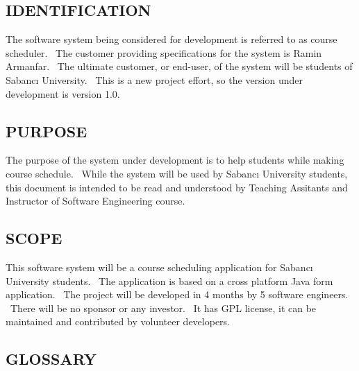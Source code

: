 \documentclass[twoside,letterpaper]{article}
\begin{document}
\subsection[IDENTIFICATION]{\rmfamily\bfseries\color{black}
IDENTIFICATION}

{\color{black}
\begin{flushleft}The software system being considered for development is referred to as course scheduler. \ The customer providing specifications
for the system is Ramin Armanfar. \ The ultimate
customer, or end-user, of the system will be students of Sabanc{\i}  University. \ This is a new project effort, so the
version under development is version 1.0.\end{flushleft}}

\subsection[PURPOSE]{\rmfamily\bfseries\color{black}
PURPOSE}

{\color{black}
\begin{flushleft}The purpose of the system under development is to help students while making course schedule. \ While the system will be used by Sabanc{\i} University students,
this document is intended to be read and understood by Teaching Assitants and Instructor of Software Engineering course.\end{flushleft}}

\subsection[SCOPE]{\rmfamily\bfseries\color{black}
SCOPE}

{\color{black}
\begin{flushleft}
This software system will be a course scheduling application for Sabanc\i{} University students. \ The application is based on a cross platform Java form application. \ The project will be developed in 4 months by 5 software engineers. \ There will be no sponsor or any investor. \ It has GPL license, it can be maintained and contributed by volunteer developers.



\end{flushleft}}

\subsection[GLOSSARY]{\rmfamily\bfseries\color{black}
GLOSSARY}
{\itshape\color{black}}
\end{document}
